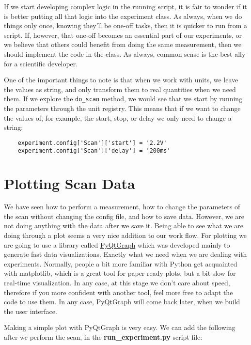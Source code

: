 If we start developing complex logic in the running script, it is fair to wonder if it is better putting all that logic into the experiment class. As always, when we do things only once, knowing they'll be one-off tasks, then it is quicker to run from a script. If, however, that one-off becomes an essential part of our experiments, or we believe that others could benefit from doing the same measurement, then we should implement the code in the class. As always, common sense is the best ally for a scientific developer.

One of the important things to note is that when we work with units, we leave the values as string, and only transform them to real quantities when we need them. If we explore the \texttt{do\_scan} method, we would see that we start by running the parameters through the unit registry. This means that if we want to change the values of, for example, the start, stop, or delay we only need to change a string:

\begin{verbatim}
    experiment.config['Scan']['start'] = '2.2V'
    experiment.config['Scan']['delay'] = '200ms'
\end{verbatim}

\section{Plotting Scan Data}\label{sec:basic-plotting}
We have seen how to perform a measurement, how to change the parameters of the scan without changing the config file, and how to save data. However, we are not doing anything with the data after we save it. Being able to see what we are doing through a plot seems a very nice addition to our work flow. For plotting we are going to use a library called \href{http://www.pyqtgraph.org/}{PyQtGraph} which was developed mainly to generate fast data visualizations. Exactly what we need when we are dealing with experiments. Normally, people a bit more familiar with Python get acquainted with matplotlib, which is a great tool for paper-ready plots, but a bit slow for real-time visualization. In any case, at this stage we don't care about speed, therefore if you more confident with another tool, feel more free to adapt the code to use them. In any case, PyQtGraph will come back later, when we build the user interface.

Making a simple plot with PyQtGraph is very easy. We can add the following after we perform the scan, in the \textbf{run\_experiment.py} script file:

